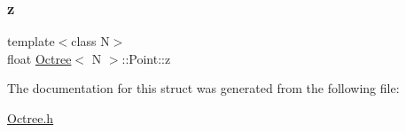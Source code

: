 \subsubsection{\texorpdfstring{z}{z}}
{\footnotesize\ttfamily template$<$class N$>$ \\
float \hyperlink{classOctree}{Octree}$<$ N $>$\+::Point\+::z}



The documentation for this struct was generated from the following file\+:\begin{DoxyCompactItemize}
\item 
\hyperlink{Octree_8h}{Octree.\+h}\end{DoxyCompactItemize}
